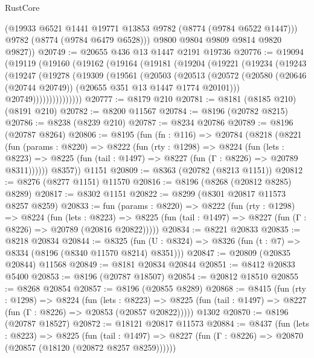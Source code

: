 \begin{lexlean}{RustCore}
\begin{coremodule}
          (@19933 @6521 @1441 @19771 @13853 @9782 (@8774 (@9784 @6522 @1447)))
          @9782
          (@8774 (@9784 @6479 @6528)))
        @9800
        @9804
        @9809
        @9814
        @9820
        @9827))
@20749 := @20655 @436 @13 @1447 @2191 @19736
@20776 := @19094
    (@19119
      (@19160
        (@19162
          (@19164
            (@19181
              (@19204
                (@19221
                  (@19234
                    (@19243
                      (@19247
                        (@19278
                          (@19309
                            (@19561
                              (@20503
                                (@20513
                                  (@20572
                                    (@20580
                                      (@20646 (@20744 @20749))
                                      (@20655 @351 @13 @1447 @1774 @20101)))
                                  @20749)))))))))))))))
@20777 := @8179 @210
@20781 := @8181 (@8185 @210) (@8191 @210)
@20782 := @8200 @11567
@20784 := @8196 (@20782 @8215)
@20786 := @8238 (@8239 @210)
@20787 := @8234 @20786
@20789 := @8196 (@20787 @8264)
@20806 := @8195
    (fun (fn : @116) =>
    @20784
      (@8218
        (@8221
          (fun (params : @8220) =>
          @8222
            (fun (rty : @1298) =>
            @8224
              (fun (lets : @8223) =>
              @8225 (fun (tail : @1497) => @8227 (fun (Γ : @8226) => @20789 @8311))))))
        @8357))
    @1151
@20809 := @8363 (@20782 (@8213 @1151))
@20812 := @8276 (@8277 @1151) @11570
@20816 := @8196 (@8268 (@20812 @8285) @8289)
@20817 := @8302 @1151
@20822 := @8299 (@8301 @20817 @11573 @8257 @8259)
@20833 := fun (params : @8220) =>
  @8222
    (fun (rty : @1298) =>
    @8224
      (fun (lets : @8223) =>
      @8225 (fun (tail : @1497) => @8227 (fun (Γ : @8226) => @20789 (@20816 @20822)))))
@20834 := @8221 @20833
@20835 := @8218 @20834
@20844 := @8325
    (fun (U : @8324) => @8326 (fun (t : @7) => @8334 (@8196 (@8340 @11570 @8214) @8351)))
@20847 := @20809 (@20835 @20844) @11568
@20849 := @8181 @20834 @20844
@20851 := @8412 @20833 @5400
@20853 := @8196 (@20787 @18507)
@20854 := @20812 @18510
@20855 := @8268 @20854
@20857 := @8196 (@20855 @8289)
@20868 := @8415
    (fun (rty : @1298) =>
    @8224
      (fun (lets : @8223) =>
      @8225 (fun (tail : @1497) => @8227 (fun (Γ : @8226) => @20853 (@20857 @20822)))))
    @1302
@20870 := @8196 (@20787 @18527)
@20872 := @18121 @20817 @11573
@20884 := @8437
    (fun (lets : @8223) =>
    @8225
      (fun (tail : @1497) =>
      @8227 (fun (Γ : @8226) => @20870 (@20857 (@18120 (@20872 @8257 @8259))))))

\end{coremodule}
\end{lexlean}
